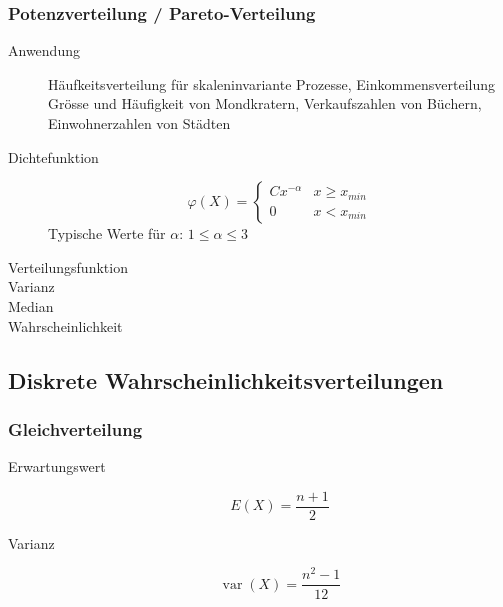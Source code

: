 \subsubsection{Potenzverteilung / Pareto-Verteilung}
\begin{description}
  \item[Anwendung] Häufkeitsverteilung für skaleninvariante Prozesse,
    Einkommensverteilung Grösse und Häufigkeit von Mondkratern,
    Verkaufszahlen von Büchern, Einwohnerzahlen von Städten
  \item[Dichtefunktion] \[ \varphi(X) = \begin{cases} Cx^{-\alpha} & x \geq
    x_{min} \\ 0 & x < x_{min}\end{cases} \] Typische Werte für $\alpha$:
    $1 \leq \alpha \leq 3$
  \item[Verteilungsfunktion]
  \item[Varianz]
  \item[Median]
  \item[Wahrscheinlichkeit]
\end{description}

\subsection{Diskrete Wahrscheinlichkeitsverteilungen}
\subsubsection{Gleichverteilung}
\begin{description}
  \item[Erwartungswert] \[ E(X) = \frac{n+1}{2} \]
  \item[Varianz] \[ \operatorname{var}(X) = \frac{n^2-1}{12}\]
\end{description}

